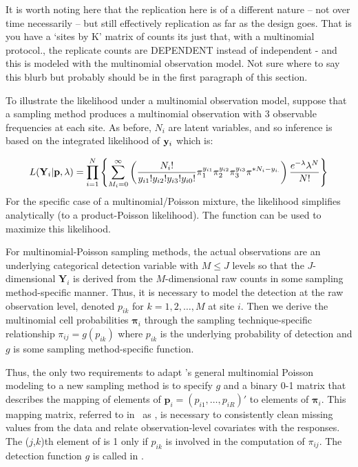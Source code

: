 \documentclass[article,shortnames]{jss}
\newcommand{\um}{\pkg{unmarked}}
\begin{document}
It is worth noting here that the replication here is of a different 
nature -- not over time necessarily -- but still effectively replication as 
far as the design goes. That is you have a `sites by K' matrix of counts 
its just that, with a multinomial protocol., the replicate counts are 
DEPENDENT instead of independent - and this is modeled with the 
multinomial observation model.  Not sure where to say this blurb but 
probably should be in the first paragraph of this section. 

To illustrate the likelihood under a multinomial observation model, 
suppose that a sampling method produces a multinomial observation 
with 3 observable frequencies at each site. As before, $N_{i}$ are 
latent variables, and so inference is based on the integrated 
likelihood of ${\bf y}_{i}$ which is:

\begin{equation}
L({\bf Y}_i| {\bf p},\lambda) = 
 \prod_{i=1}^{N} \left\{ 
  \sum_{M_{i}=0}^{\infty} \left(
 \frac{N_{i}!}{ y_{i1}! y_{i2}! y_{i3}! y_{i0}!}
  \pi_{1}^{y_{i1}}
  \pi_{2}^{y_{i2}}
  \pi_{3}^{y_{i3}}
  \pi^{*N_{i}- y_{i.}} \right)
 \frac{e^{-\lambda} \lambda^N}{N!} \right\}
\end{equation}
For the specific case of a multinomial/Poisson mixture, the likelihood 
simplifies analytically (to a product-Poisson likelihood).
The function  can be used to maximize this likelihood.

For multinomial-Poisson sampling methods, the actual observations are
an underlying categorical detection variable with $M \leq J$ levels so
that the $J$-dimensional $\mathbf Y_{i}$ is derived from the
$M$-dimensional raw counts in some sampling method-specific manner.
Thus, it is necessary to model the detection at the raw observation
level, denoted $p_{ik}$ for $k=1,2,\dots,M$ at site $i$.  Then we
derive the multinomial cell probabilities $\boldsymbol \pi_{i}$
through the sampling technique-specific relationship
$\pi_{ij}=g(p_{ik})$ where $p_{ik}$ is the underlying probability of
detection and $g$ is some sampling method-specific function.  

Thus, the only two requirements to adapt \um's general multinomial Poisson
modeling to a new sampling method is to specify $g$ and a binary 0-1
matrix that describes the mapping of elements of
$\mathbf p_{i} = (p_{i1},\dots,p_{iR})'$ to elements of
$\boldsymbol \pi_{i}$.  This mapping matrix, referred to in
\um\ as , is necessary to consistently clean
missing values from the data and relate observation-level covariates
with the responses.  The ($j$,$k$)th element of
 is 1 only if $p_{ik}$ is involved in the computation of
$\pi_{ij}$.  The detection function $g$ is called  in \um.
\end{document}
